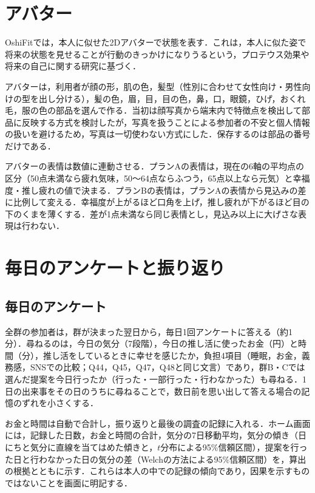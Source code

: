 \section{アバター}
OshiFitでは，本人に似せた2Dアバターで状態を表す．これは，本人に似た姿で将来の状態を見せることが行動のきっかけになりうるという，プロテウス効果や将来の自己に関する研究\cite{yee2007,fox2009,hershfield2011}に基づく．

アバターは，利用者が顔の形，肌の色，髪型（性別に合わせて女性向け・男性向けの型を出し分ける），髪の色，眉，目，目の色，鼻，口，眼鏡，ひげ，おくれ毛，服の色の部品を選んで作る．当初は顔写真から端末内で特徴点を検出して部品に反映する方式を検討したが，写真を扱うことによる参加者の不安と個人情報の扱いを避けるため，写真は一切使わない方式にした．保存するのは部品の番号だけである．

アバターの表情は数値に連動させる．プランAの表情は，現在の6軸の平均点の区分（50点未満なら疲れ気味，50〜64点ならふつう，65点以上なら元気）と幸福度・推し疲れの値で決まる．プランBの表情は，プランAの表情から見込みの差に比例して変える．幸福度が上がるほど口角を上げ，推し疲れが下がるほど目の下のくまを薄くする．差が1点未満なら同じ表情とし，見込み以上に大げさな表現は行わない．

\section{毎日のアンケートと振り返り}
\subsection{毎日のアンケート}
全群の参加者は，群が決まった翌日から，毎日1回アンケートに答える（約1分）．尋ねるのは，今日の気分（7段階），今日の推し活に使ったお金（円）と時間（分），推し活をしているときに幸せを感じたか，負担4項目（睡眠，お金，義務感，SNSでの比較；Q44，Q45，Q47，Q48と同じ文言）であり，群B・Cでは選んだ提案を今日行ったか（行った・一部行った・行わなかった）も尋ねる．1日の出来事をその日のうちに尋ねることで，数日前を思い出して答える場合の記憶のずれを小さくする\cite{bolger2003,robinson2002}．

お金と時間は自動で合計し，振り返りと最後の調査の記録に入れる．ホーム画面には，記録した日数，お金と時間の合計，気分の7日移動平均，気分の傾き（日にちと気分に直線を当てはめた傾きと，$t$分布による95\%信頼区間），提案を行った日と行わなかった日の気分の差（Welchの方法による95\%信頼区間）を，算出の根拠とともに示す．これらは本人の中での記録の傾向であり，因果を示すものではないことを画面に明記する．

